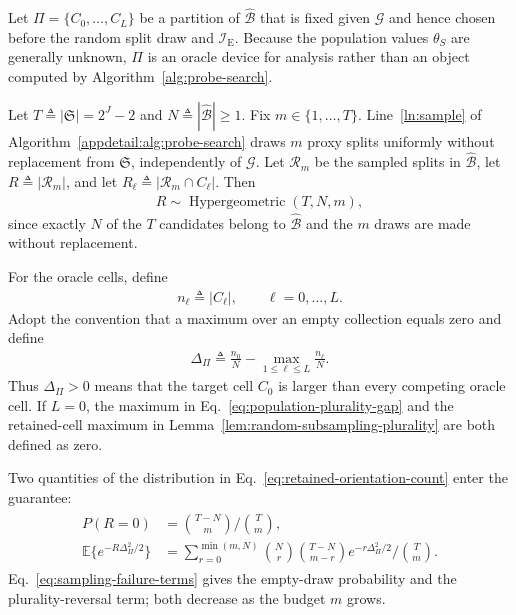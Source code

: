 Let $\Pi=\{C_0,\ldots,C_L\}$ be a partition of $\widehat{\mathcal B}$ that is fixed given $\mathcal G$ and hence chosen before the random split draw and $\mathcal I_{\mathrm E}$. Because the population values $\theta_S$ are generally unknown, $\Pi$ is an oracle device for analysis rather than an object computed by Algorithm~\ref{alg:probe-search}.

Let $T\triangleq|\mathfrak S|=2^J-2$ and $N\triangleq|\widehat{\mathcal B}|\ge1$. Fix $m\in\{1,\ldots,T\}$. Line~\ref{ln:sample} of Algorithm~\ref{appdetail:alg:probe-search} draws $m$ proxy splits uniformly without replacement from $\mathfrak S$, independently of $\mathcal G$. Let $\mathcal R_m$ be the sampled splits in $\widehat{\mathcal B}$, let $R\triangleq|\mathcal R_m|$, and let $R_\ell\triangleq|\mathcal R_m\cap C_\ell|$. Then
\begin{align}
	R\sim\operatorname{Hypergeometric}(T,N,m),
\label{eq:retained-orientation-count}
\end{align}
since exactly $N$ of the $T$ candidates belong to $\widehat{\mathcal B}$ and the $m$ draws are made without replacement.

 For the oracle cells, define
\begin{align}\label{eq:population-orientation-count}
	n_\ell\triangleq|C_\ell|,\qquad \ell=0,\ldots,L.
\end{align}
Adopt the convention that a maximum over an empty collection equals zero and define
\begin{align}\label{eq:population-plurality-gap}
	\Delta_\Pi\triangleq\frac{n_0}{N}-\max_{1\le\ell\le L}\frac{n_\ell}{N}.
\end{align}
Thus $\Delta_\Pi>0$ means that the target cell $C_0$ is larger than every competing oracle cell. If $L=0$, the maximum in Eq.~\eqref{eq:population-plurality-gap} and the retained-cell maximum in Lemma~\ref{lem:random-subsampling-plurality} are both defined as zero.

Two quantities of the distribution in Eq.~\eqref{eq:retained-orientation-count} enter the guarantee:
\begin{align}
\begin{aligned}
P(R=0)&=\binom{T-N}{m}\Big/\binom{T}{m},\\
\mathbb E\{e^{-R\Delta_\Pi^2/2}\}&=\sum_{r=0}^{\min(m,N)}\binom Nr\binom{T-N}{m-r}e^{-r\Delta_\Pi^2/2}\Big/\binom Tm.
\end{aligned}
\label{eq:sampling-failure-terms}
\end{align}
Eq.~\eqref{eq:sampling-failure-terms} gives the empty-draw probability and the plurality-reversal term; both decrease as the budget $m$ grows.

